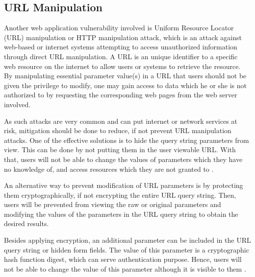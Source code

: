 \documentclass[runningheads]{llncs}
\begin{document}
\subsection{URL Manipulation} 
Another web application vulnerability involved is Uniform Resource Locator (URL) manipulation or HTTP manipulation attack, which is an attack against web-based or internet systems attempting to access unauthorized information through direct URL manipulation. A URL is an unique identifier to a specific web resource on the internet to allow users or systems to retrieve the resource. By manipulating essential parameter value(s) in a URL that users should not be given the privilege to modify, one may gain access to data which he or she is not authorized to by requesting the corresponding web pages from the web server involved. 

As such attacks are very common and can put internet or network services at risk, mitigation should be done to reduce, if not prevent URL manipulation attacks. One of the effective solutions is to hide the query string parameters from view. This can be done by not putting them in the user viewable URL. With that, users will not be able to change the values of parameters which they have no knowledge of, and access resources which they are not granted to \cite{sharma_nagpal_2015}.

An alternative way to prevent modification of URL parameters is by protecting them cryptographically, if not encrypting the entire URL query string. Then, users will be prevented from viewing the raw or original parameters and modifying the values of the parameters in the URL query string to obtain the desired results. 

Besides applying encryption, an additional parameter can be included in the URL query string or hidden form fields. The value of this parameter is a cryptographic hash function digest, which can serve authentication purpose. Hence, users will not be able to change the value of this parameter although it is visible to them \cite{sharma_nagpal_2015}.
%
\end{document}
